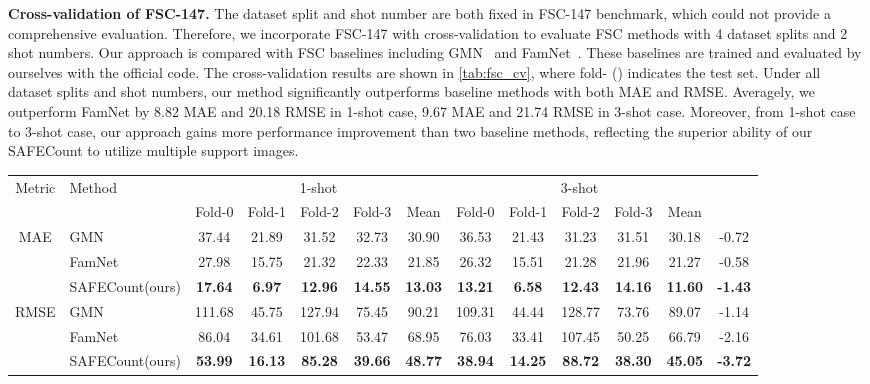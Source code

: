 \documentclass[10pt,twocolumn,letterpaper]{article}
\newcommand{\method}{SAFECount\xspace}
\begin{document}
\vspace{2pt}\noindent \textbf{Cross-validation of FSC-147.}  
The dataset split and shot number are both fixed in FSC-147 benchmark, which could not provide a comprehensive evaluation. 
Therefore, we incorporate FSC-147 with cross-validation to evaluate FSC methods with 4 dataset splits and 2 shot numbers. 
Our approach is compared with FSC baselines including GMN~\cite{gmn} and FamNet~\cite{famnet}. 
These baselines are trained and evaluated by ourselves with the official code. 
The cross-validation results are shown in \cref{tab:fsc_cv}, where fold- () indicates the test set. 
Under all dataset splits and shot numbers, our method significantly outperforms baseline methods with both MAE and RMSE. 
Averagely, we outperform FamNet by 8.82 MAE and 20.18 RMSE in 1-shot case, 9.67 MAE and 21.74 RMSE in 3-shot case. 
Moreover, from 1-shot case to 3-shot case, our approach gains more performance improvement than two baseline methods, reflecting the superior ability of our \method to utilize multiple support images. 


\begin{table*}[!ht]
\caption{
    \textbf{Counting performance with cross-validation setting} on FSC-147 dataset~\cite{famnet}.
Fold- () indicates the test set.
 stands for the averaged improvement of the 3-shot case over the 1-shot case. 
}
\centering
\scriptsize
\begin{threeparttable}
\begin{tabular}{cl|ccccc|ccccc|c}
\toprule
\multirow{2}{*}{Metric} & \multirow{2}{*}{Method} 
& \multicolumn{5}{c|}{1-shot} & \multicolumn{5}{c|}{3-shot} & \multirow{2}{*}{} \\ 
& & Fold-0 & Fold-1 & Fold-2 & Fold-3 & Mean & Fold-0 & Fold-1 & Fold-2 & Fold-3 & Mean & \\ 
\midrule
\multirow{3}{*}{MAE} 
& GMN~\cite{gmn} & 37.44 & 21.89 & 31.52 & 32.73 & 30.90 & 36.53 & 21.43 & 31.23 & 31.51 & 30.18 & -0.72 \\
& FamNet~\cite{famnet} & 27.98 & 15.75 & 21.32 & 22.33 & 21.85 & 26.32 & 15.51 & 21.28 & 21.96 & 21.27 & -0.58 \\
\cmidrule{2-13}
& \method (ours) & \textbf{17.64} & \textbf{6.97} & \textbf{12.96} & \textbf{14.55} & \textbf{13.03} & \textbf{13.21} & \textbf{6.58} & \textbf{12.43} & \textbf{14.16} & \textbf{11.60} & \textbf{-1.43} \\
\midrule
\multirow{3}{*}{RMSE} 
& GMN~\cite{gmn} & 111.68 & 45.75 & 127.94 & 75.45 & 90.21 & 109.31 & 44.44 & 128.77 & 73.76 & 89.07 & -1.14 \\
& FamNet~\cite{famnet} & 86.04 & 34.61 & 101.68 & 53.47 & 68.95 & 76.03 & 33.41 & 107.45 & 50.25 & 66.79 & -2.16 \\
\cmidrule{2-13}
& \method (ours) & \textbf{53.99} & \textbf{16.13} & \textbf{85.28} & \textbf{39.66} & \textbf{48.77} & \textbf{38.94} & \textbf{14.25} & \textbf{88.72} & \textbf{38.30} & \textbf{45.05} & \textbf{-3.72} \\ 
\bottomrule
\end{tabular}
\end{threeparttable}
\vspace{-10pt}
\label{tab:fsc_cv}
\end{table*}
\end{document}
